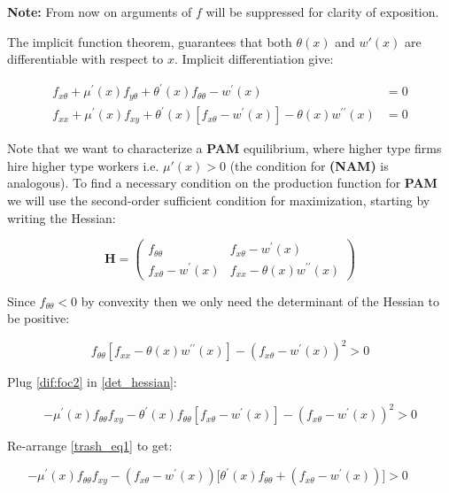 \documentclass[12pt]{article}
\theoremstyle{definition}
\begin{document}
\textbf{Note:} From now on arguments of $f$ will be suppressed for clarity of exposition.

The implicit function theorem, guarantees that both $\theta(x)$ and $w'(x)$ are differentiable with respect to $x$. Implicit differentiation give:

\begin{subequations}
\label{dif:foc}
\begin{align}
f_{x \theta}+\mu^{\prime}(x) f_{y \theta}+\theta^{\prime}(x) f_{\theta \theta}-w^{\prime}(x) &=0\label{dif:foc1}  \\
f_{x x} + \mu^{\prime}(x) f_{x y} + \theta^{\prime}(x)\left[f_{x \theta}-w^{\prime}(x)\right]-\theta(x) w^{\prime \prime}(x) &=0 \label{dif:foc2}
\end{align}
\end{subequations}

Note that we want to characterize a \textbf{PAM} equilibrium, where higher type firms hire higher type workers i.e. $\mu'(x)>0$ (the condition for \textbf{(NAM)} is analogous). To find a necessary condition on the production function for \textbf{PAM} we will use the second-order sufficient condition for maximization, starting by writing the Hessian:

$$\mathbf{H}=\left(\begin{array}{cc}
f_{\theta \theta} & f_{x \theta}-w^{\prime}(x) \\
f_{x \theta}-w^{\prime}(x) & f_{x x}-\theta(x) w^{\prime \prime}(x)
\end{array}\right)$$

Since $f_{\theta \theta} < 0$ by convexity then we only need the determinant of the Hessian to be positive: 

\begin{equation}
f_{\theta \theta}\left[f_{x x}-\theta(x)  w^{\prime \prime}(x)\right]-\left(f_{x \theta}-w^{\prime}(x)\right)^{2} > 0 \label{det_hessian}
\end{equation}


Plug \eqref{dif:foc2} in \eqref{det_hessian}:

\begin{equation}
-\mu^{\prime}(x) f_{\theta \theta}f_{x y}-\theta^{\prime}(x) f_{\theta \theta}\left[f_{x \theta}-w^{\prime}(x)\right]-\left(f_{x \theta}-w^{\prime}(x)\right)^{2} > 0 \label{trash_eq1}
\end{equation}

Re-arrange \eqref{trash_eq1} to get:

\begin{equation}
-\mu^{\prime}(x) f_{\theta \theta}f_{x y}-\left(f_{x \theta}-w^{\prime}(x)\right)\Big[\theta^{\prime}(x) f_{\theta \theta}+\left(f_{x \theta}-w^{\prime}(x)\right)\Big] > 0 \qquad \label{trash_eq2}
\end{equation}
\end{document}
